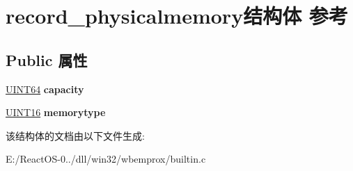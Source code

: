 \hypertarget{structrecord__physicalmemory}{}\section{record\+\_\+physicalmemory结构体 参考}
\label{structrecord__physicalmemory}
\subsection*{Public 属性}
\begin{DoxyCompactItemize}
\item 
\mbox{\label{structrecord__physicalmemory_abb2e51fb089ca913ef30aa192ef7bd67}} 
\hyperlink{_processor_bind_8h_a57be03562867144161c1bfee95ca8f7c}{U\+I\+N\+T64} {\bfseries capacity}
\item 
\mbox{\label{structrecord__physicalmemory_a4dfa5d76a2f2fb912f1dae3f93fa0bf2}} 
\hyperlink{_processor_bind_8h_a09f1a1fb2293e33483cc8d44aefb1eb1}{U\+I\+N\+T16} {\bfseries memorytype}
\end{DoxyCompactItemize}


该结构体的文档由以下文件生成\+:\begin{DoxyCompactItemize}
\item 
E\+:/\+React\+O\+S-\/0../dll/win32/wbemprox/builtin.\+c\end{DoxyCompactItemize}
